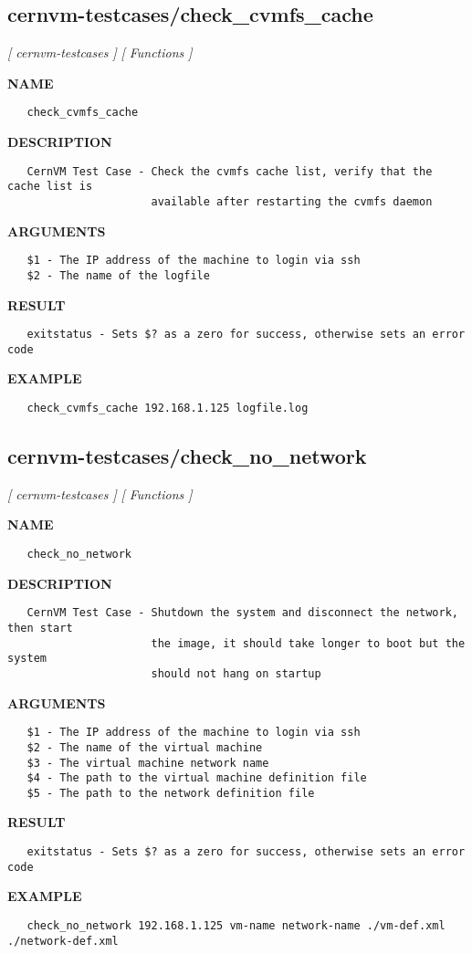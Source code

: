 \subsection{cernvm-testcases/check\_cvmfs\_cache}
\textsl{[ cernvm-testcases ]}
\textsl{[ Functions ]}

\label{ch:robo19}
\label{ch:cernvm_testcases_check_cvmfs_cache}
\textbf{NAME}
\begin{verbatim}
   check_cvmfs_cache
\end{verbatim}
\textbf{DESCRIPTION}
\begin{verbatim}
   CernVM Test Case - Check the cvmfs cache list, verify that the cache list is 
                      available after restarting the cvmfs daemon
\end{verbatim}
\textbf{ARGUMENTS}
\begin{verbatim}
   $1 - The IP address of the machine to login via ssh
   $2 - The name of the logfile
\end{verbatim}
\textbf{RESULT}
\begin{verbatim}
   exitstatus - Sets $? as a zero for success, otherwise sets an error code
\end{verbatim}
\textbf{EXAMPLE}
\begin{verbatim}
   check_cvmfs_cache 192.168.1.125 logfile.log
\end{verbatim}
\newpage
\subsection{cernvm-testcases/check\_no\_network}
\textsl{[ cernvm-testcases ]}
\textsl{[ Functions ]}

\label{ch:robo20}
\label{ch:cernvm_testcases_check_no_network}
\textbf{NAME}
\begin{verbatim}
   check_no_network
\end{verbatim}
\textbf{DESCRIPTION}
\begin{verbatim}
   CernVM Test Case - Shutdown the system and disconnect the network, then start
                      the image, it should take longer to boot but the system
                      should not hang on startup
\end{verbatim}
\textbf{ARGUMENTS}
\begin{verbatim}
   $1 - The IP address of the machine to login via ssh
   $2 - The name of the virtual machine
   $3 - The virtual machine network name
   $4 - The path to the virtual machine definition file
   $5 - The path to the network definition file
\end{verbatim}
\textbf{RESULT}
\begin{verbatim}
   exitstatus - Sets $? as a zero for success, otherwise sets an error code
\end{verbatim}
\textbf{EXAMPLE}
\begin{verbatim}
   check_no_network 192.168.1.125 vm-name network-name ./vm-def.xml ./network-def.xml
\end{verbatim}
\newpage
